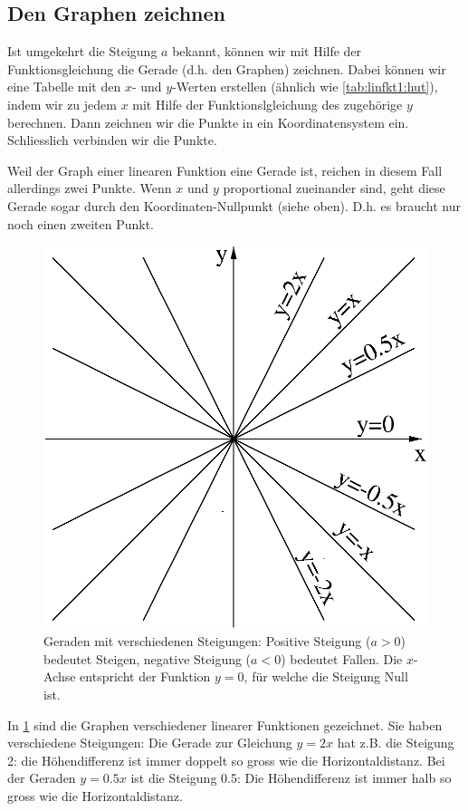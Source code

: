 \documentclass[%
11pt,%
twoside,%
titlepage,%
german,%
headsepline%
]{scrartcl}
\begin{document}
\subsection{Den Graphen zeichnen}
\label{linfkt1:allg:graph}

Ist umgekehrt die Steigung $a$ bekannt, k\"onnen wir mit Hilfe der Funktionsgleichung die Gerade (d.h. den Graphen) zeichnen. Dabei k\"onnen wir eine Tabelle mit den $x$- und $y$-Werten erstellen (\"ahnlich wie \ref{tab:linfkt1:hut}), indem wir zu jedem $x$ mit Hilfe der Funktionslgleichung des zugeh\"orige $y$ berechnen. Dann zeichnen wir die Punkte in ein Koordinatensystem ein. Schliesslich verbinden wir die Punkte.

Weil der Graph einer linearen Funktion eine Gerade ist, reichen in diesem Fall allerdings zwei Punkte. Wenn $x$ und $y$ proportional zueinander sind, geht diese Gerade sogar durch den Koordinaten-Nullpunkt (siehe oben). D.h. es braucht nur noch einen zweiten Punkt.

\begin{figure}[b!]
\centering
\includegraphics[width=0.8\columnwidth]{pictures/steigungen.eps}
\caption{Geraden mit verschiedenen Steigungen: Positive Steigung ($a>0$) bedeutet Steigen, negative Steigung ($a<0$) bedeutet Fallen. Die $x$-Achse entspricht der Funktion $y=0$, f\"ur welche die Steigung Null ist.}
\label{fig:linfkt1:steigungen}
\end{figure}

In \ref{fig:linfkt1:steigungen} sind die Graphen verschiedener linearer Funktionen gezeichnet. Sie haben verschiedene Steigungen: Die Gerade zur Gleichung $y=2x$ hat z.B. die Steigung 2: die H\"ohendifferenz ist immer doppelt so gross wie die Horizontaldistanz. Bei der Geraden $y=0.5x$ ist die Steigung 0.5: Die H\"ohendifferenz ist immer halb so gross wie die Horizontaldistanz.
\end{document}

